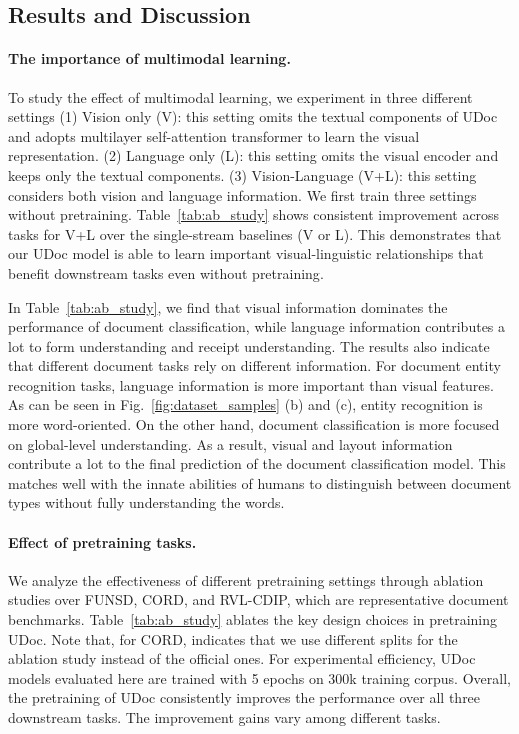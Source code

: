 \documentclass{article}
\begin{document}
	\subsection{Results and Discussion}\label{sec:abliation_study}
	\paragraph{The importance of multimodal learning.}
	To study the effect of multimodal learning, we experiment {in} three different settings (1) Vision only (V): this {setting omits the textual components of} UDoc and adopts multilayer self-attention transformer to learn the visual representation. (2) Language only (L): this setting {omits} the {visual} encoder and keeps {only} the {textual components}. (3) Vision-Language (V+L): this setting considers both vision and language {information}. We first train three settings without pretraining. Table~\ref{tab:ab_study} shows consistent improvement across tasks for V+L over the single-stream baselines (V or L). 
	This demonstrates that our UDoc model is able to learn important visual-linguistic relationships that {benefit} downstream tasks {even without pretraining}.
	
	In Table~\ref{tab:ab_study}, we {find} that {visual} information dominates the performance of document classification, while language information contributes a lot to form understanding and receipt understanding. The results also {indicate} that different document tasks rely on different information. For document entity recognition tasks, language information {is more important} than visual features. As can be seen in Fig.~\ref{fig:dataset_samples} (b) and (c), entity recognition is more {word-oriented}. {On the other hand,} document classification is more focused on global{-level} understanding. {As a result, } visual and layout information contribute a lot to the final prediction {of the document classification model}. This {matches well} with {the innate abilities of humans to distinguish between} {document types} without {fully understand{ing}} the words. 
	
	\paragraph{Effect of pretraining tasks.}
	We analyze the effectiveness of different pretraining settings through ablation studies over FUNSD, CORD, and RVL-CDIP, {which are} representative document benchmarks. Table~\ref{tab:ab_study} ablates {the} key design choices in pretraining UDoc. Note that, for CORD,  indicates that we use different splits for the ablation study instead of the official ones. For experimental efficiency, UDoc {models evaluated here} are {trained with} 5 epochs on 300k training corpus. Overall, the pretraining of UDoc {consistently} improves the performance over all three downstream tasks. The improvement {gains vary among} different tasks.
	
\end{document}
